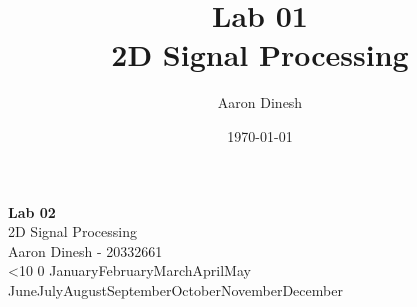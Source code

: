 \documentclass{article}
\title{
    \textbf{Lab 01}\\
    \vspace{1mm}
    {2D Signal Processing}
}
\author{Aaron Dinesh}
\date{\today}
\renewcommand{\today}{\ifnum\number\day<10 0\fi \number\day \space%
\ifcase \month \or January\or February\or March\or April\or May%
\or June\or July\or August\or September\or October\or November\or December\fi \space%
\number \year}
\begin{document}
    \fancyfoot{}


    \begin{titlepage}
        \vspace*{\fill}
        \begin{center}
          {\Huge \textbf{Lab 02}}\\[0.5cm]
          {\Large 2D Signal Processing}\\[0.4cm]
          {\Large Aaron Dinesh - 20332661}\\[0.3cm]
          \today
        \end{center}
        \vspace*{\fill}
    \end{titlepage}
    \newpage
    
    
    
    
    
\end{document}
